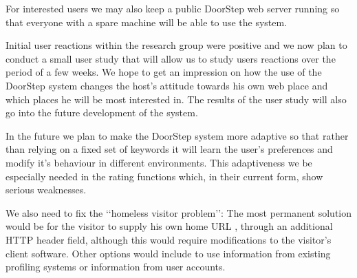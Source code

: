 \documentclass[a4paper]{danarticle}
\theoremstyle{remark}
\begin{document}
    For interested users we may also keep a public DoorStep web server running
    so that everyone with a spare machine will be able to use the system.
    
    Initial user reactions within the research group were positive and we now
    plan to conduct a small user study that will allow us to study users
    reactions over the period of a few weeks. We hope to get an impression on how
    the use of the DoorStep system changes the host's attitude towards his own
    web place and which places he will be most interested in. The results of the
    user study will also go into the future development of the system.
    
    In the future we plan to make the DoorStep system more adaptive so that
    rather than relying on a fixed set of keywords it will learn the user's
    preferences and modify it's behaviour in different environments. This
    adaptiveness we be especially needed in the rating functions which, in their
    current form, show serious weaknesses.
    
    We also need
    to fix the \lq\lq homeless visitor problem\rq\rq : The most permanent
    solution would be for the visitor to supply his own home URL \cite{webaware},
    through an additional HTTP header field, although this would require
    modifications to the visitor's client software. Other options would include
    to use information from existing profiling systems or
    information from user accounts.
    
\end{document}
